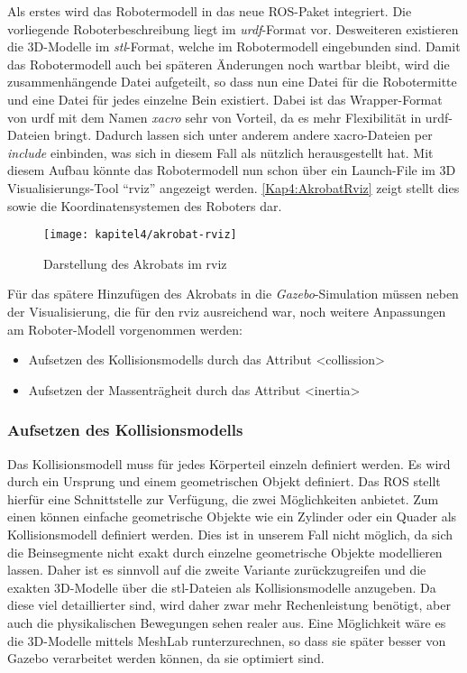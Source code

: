 \begin{itemize}
Als erstes wird das Robotermodell in das neue \ac{ROS}-Paket integriert. Die vorliegende Roboterbeschreibung liegt im \emph{urdf}-Format vor. Desweiteren existieren die 3D-Modelle im \emph{stl}-Format, welche im Robotermodell eingebunden sind. Damit das Robotermodell auch bei späteren Änderungen noch wartbar bleibt, wird die zusammenhängende Datei aufgeteilt, so dass nun eine Datei für die Robotermitte und eine Datei für jedes einzelne Bein existiert. Dabei ist das Wrapper-Format von urdf mit dem Namen \emph{xacro} sehr von Vorteil, da es mehr Flexibilität in urdf-Dateien bringt. Dadurch lassen sich unter anderem andere xacro-Dateien per \emph{include} einbinden, was sich in diesem Fall als nützlich herausgestellt hat. Mit diesem Aufbau könnte das Robotermodell nun schon über ein Launch-File im 3D Visualisierungs-Tool "`rviz"' angezeigt werden. \autoref{Kap4:AkrobatRviz} zeigt stellt dies sowie die Koordinatensystemen des Roboters dar.

\begin{figure}[b!]
  \centering
  \texttt{[image: kapitel4/akrobat-rviz]}
  \caption{Darstellung des Akrobats im rviz}
  \label{Kap4:AkrobatRviz}
\end{figure}

Für das spätere Hinzufügen des Akrobats in die \emph{Gazebo}-Simulation müssen neben der Visualisierung, die für den rviz ausreichend war, noch weitere Anpassungen am Roboter-Modell vorgenommen werden:
\begin{itemize}
  \item Aufsetzen des Kollisionsmodells durch das Attribut <collission>
  \item Aufsetzen der Massenträgheit durch das Attribut <inertia>
\end{itemize}

\subsubsection{Aufsetzen des Kollisionsmodells}

Das Kollisionsmodell muss für jedes Körperteil einzeln definiert werden. Es wird durch ein Ursprung und einem geometrischen Objekt definiert. Das \ac{ROS} stellt hierfür eine Schnittstelle zur Verfügung, die zwei Möglichkeiten anbietet. Zum einen können einfache geometrische Objekte wie ein Zylinder oder ein Quader als Kollisionsmodell definiert werden. Dies ist in unserem Fall nicht möglich, da sich die Beinsegmente nicht exakt durch einzelne geometrische Objekte modellieren lassen. Daher ist es sinnvoll auf die zweite Variante zurückzugreifen und die exakten 3D-Modelle über die stl-Dateien als Kollisionsmodelle anzugeben. Da diese viel detaillierter sind, wird daher zwar mehr Rechenleistung benötigt, aber auch die physikalischen Bewegungen sehen realer aus. Eine Möglichkeit wäre es die 3D-Modelle mittels MeshLab \autocite{LocalChapterEvents:ItalChap:ItalianChapConf2008:129-136} runterzurechnen, so dass sie später besser von Gazebo verarbeitet werden können, da sie optimiert sind.


\end{itemize}

